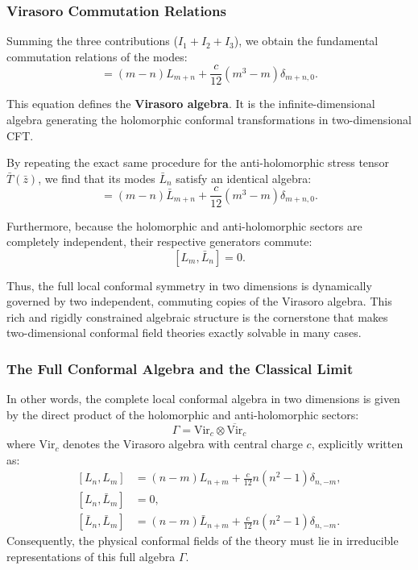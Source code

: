 \subsubsection{Virasoro Commutation Relations}

Summing the three contributions (\(I_1 + I_2 + I_3\)), we obtain the fundamental commutation relations of the modes:
\begin{equation}
    [L_m, L_n] = (m-n) L_{m+n} + \frac{c}{12} (m^3 - m) \delta_{m+n, 0}.
    \label{eq:virasoro_algebra}
\end{equation}

This equation defines the \textbf{Virasoro algebra}. It is the infinite-dimensional algebra generating the holomorphic conformal transformations in two-dimensional CFT.

By repeating the exact same procedure for the anti-holomorphic stress tensor \(\bar{T}(\bar{z})\), we find that its modes \(\bar{L}_n\) satisfy an identical algebra:
\begin{equation}
    [\bar{L}_m, \bar{L}_n] = (m-n) \bar{L}_{m+n} + \frac{c}{12} (m^3 - m) \delta_{m+n, 0}.
    \label{eq:anti-holomorphic_virasoro_algebra}
\end{equation}

Furthermore, because the holomorphic and anti-holomorphic sectors are completely independent, their respective generators commute:
\[
    [L_m, \bar{L}_n] = 0.
\]

Thus, the full local conformal symmetry in two dimensions is dynamically governed by two independent, commuting copies of the Virasoro algebra. This rich and rigidly constrained algebraic structure is the cornerstone that makes two-dimensional conformal field theories exactly solvable in many cases.

\subsubsection{The Full Conformal Algebra and the Classical Limit}

In other words, the complete local conformal algebra in two dimensions is given by the direct product of the holomorphic and anti-holomorphic sectors:
\[
    \Gamma = \text{Vir}_c \otimes \overline{\text{Vir}}_c
\]
where \(\text{Vir}_c\) denotes the Virasoro algebra with central charge \(c\), explicitly written as:
\begin{equation}
    \begin{aligned}
        [L_n, L_m]             & = (n-m)L_{n+m} + \frac{c}{12}n(n^2-1)\delta_{n,-m},       \\
        [L_n, \bar{L}_m]       & = 0,                                                      \\
        [\bar{L}_n, \bar{L}_m] & = (n-m)\bar{L}_{n+m} + \frac{c}{12}n(n^2-1)\delta_{n,-m}.
    \end{aligned}
    \label{eq:full_virasoro_algebra}
\end{equation}
Consequently, the physical conformal fields of the theory must lie in irreducible representations of this full algebra \(\Gamma\).

